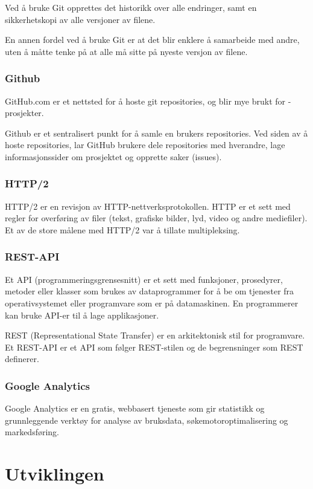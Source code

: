 Ved å bruke Git opprettes det historikk over alle endringer, samt en sikkerhetskopi av alle versjoner av filene.

En annen fordel ved å bruke Git er at det blir enklere å samarbeide med andre, uten å måtte tenke på at alle må sitte på nyeste versjon av filene.

\subsubsection{Github}
GitHub.com er et nettsted for å hoste git repositories, og blir mye brukt for -prosjekter. 

Github\cite{TechTarget} er et sentralisert punkt for å samle en brukers repositories. Ved siden av å hoste repositories, lar GitHub brukere dele repositories med hverandre, lage informasjonssider om prosjektet og opprette saker (issues).

\subsubsection{HTTP/2}
HTTP/2\cite{Belshe2015httpv} er en revisjon av HTTP-nettverksprotokollen. HTTP er et sett med regler for overføring av filer (tekst, grafiske bilder, lyd, video og andre mediefiler). Et av de store målene med HTTP/2 var å tillate multipleksing.

\subsubsection{REST-API}
Et API (programmeringsgrensesnitt) er et sett med funksjoner, prosedyrer, metoder eller klasser som brukes av dataprogrammer for å be om tjenester fra operativsystemet eller programvare som er på datamaskinen. En programmerer kan bruke API-er til å lage applikasjoner.

REST (Representational State Transfer) er en arkitektonisk stil for programvare. Et REST-API\cite{Masse2011radr} er et API som følger REST-stilen og de begrensninger som REST definerer.

\subsubsection{Google Analytics}
\label{sec:google-analytics}
Google Analytics \cite{google2019gtk} er en gratis, webbasert tjeneste som gir statistikk og grunnleggende verktøy for analyse av bruksdata, søkemotoroptimalisering og markedsføring.

\section{Utviklingen}

